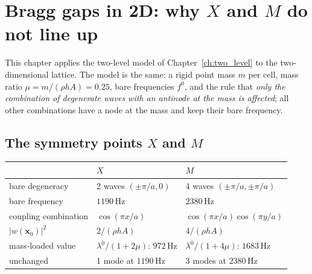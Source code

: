 
\chapter{Bragg gaps in 2D: why $X$ and $M$ do not line up}
\label{ch:bragg_2d}

This chapter applies the two-level model of Chapter~\ref{ch:two_level} to
the two-dimensional lattice. The model is the same: a rigid point mass $m$ per
cell, mass ratio $\mu = m/(\rho h A) = 0.25$, bare frequencies $f^0$, and the
rule that \emph{only the combination of degenerate waves with an antinode at
the mass is affected}; all other combinations have a node at the mass and
keep their bare frequency.

\section{The symmetry points $X$ and $M$}

\begin{center}
\begin{tabular}{|l|l|l|}
\hline
 & $X$ & $M$ \\
\hline
bare degeneracy & 2 waves $(\pm\pi/a, 0)$ & 4 waves $(\pm\pi/a, \pm\pi/a)$ \\
bare frequency & $1190\,\mathrm{Hz}$ & $2380\,\mathrm{Hz}$ \\
coupling combination & $\cos(\pi x/a)$ & $\cos(\pi x/a)\cos(\pi y/a)$ \\
$|w(\mathbf{x}_0)|^2$ & $2/(\rho h A)$ & $4/(\rho h A)$ \\
mass-loaded value & $\lambda^0/(1+2\mu)$: $972\,\mathrm{Hz}$ & $\lambda^0/(1+4\mu)$: $1683\,\mathrm{Hz}$ \\
unchanged & 1 mode at $1190\,\mathrm{Hz}$ & 3 modes at $2380\,\mathrm{Hz}$ \\
\hline
\end{tabular}
\end{center}

